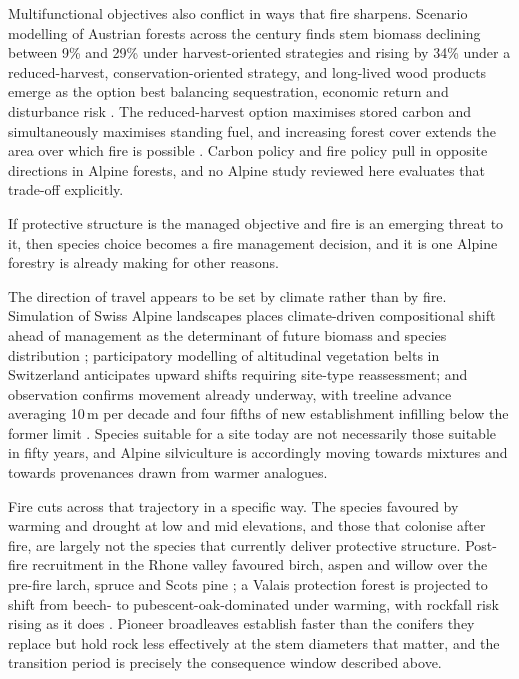 \documentclass[11pt,a4paper]{article}
\begin{document}
Multifunctional objectives also conflict in ways that fire sharpens. Scenario modelling of Austrian forests across the century finds stem biomass declining between 9\% and 29\% under harvest-oriented strategies and rising by 34\% under a reduced-harvest, conservation-oriented strategy, and long-lived wood products emerge as the option best balancing sequestration, economic return and disturbance risk \citep{jandl_strategies_2018}. The reduced-harvest option maximises stored carbon and simultaneously maximises standing fuel, and increasing forest cover extends the area over which fire is possible \citep{gerberding_mapping_2025}. Carbon policy and fire policy pull in opposite directions in Alpine forests, and no Alpine study reviewed here evaluates that trade-off explicitly.

If protective structure is the managed objective and fire is an emerging threat to it, then species choice becomes a fire management decision, and it is one Alpine forestry is already making for other reasons.

The direction of travel appears to be set by climate rather than by fire. Simulation of Swiss Alpine landscapes places climate-driven compositional shift ahead of management as the determinant of future biomass and species distribution \citep{schumacher_relative_2006}; participatory modelling of altitudinal vegetation belts in Switzerland anticipates upward shifts requiring site-type reassessment; and observation confirms movement already underway, with treeline advance averaging 10\,m per decade and four fifths of new establishment infilling below the former limit \citep{frei_evidence_2023}. Species suitable for a site today are not necessarily those suitable in fifty years, and Alpine silviculture is accordingly moving towards mixtures and towards provenances drawn from warmer analogues.

Fire cuts across that trajectory in a specific way. The species favoured by warming and drought at low and mid elevations, and those that colonise after fire, are largely not the species that currently deliver protective structure. Post-fire recruitment in the Rhone valley favoured birch, aspen and willow over the pre-fire larch, spruce and Scots pine \citep{moser_potential_2010}; a Valais protection forest is projected to shift from beech- to pubescent-oak-dominated under warming, with rockfall risk rising as it does \citep{moos_climate_2021}. Pioneer broadleaves establish faster than the conifers they replace but hold rock less effectively at the stem diameters that matter, and the transition period is precisely the consequence window described above.
\end{document}
